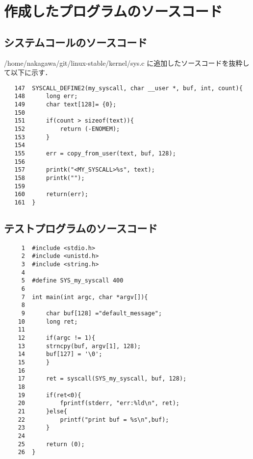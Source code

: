 \documentclass[12pt]{jsarticle}
\begin{document}
\section{作成したプログラムのソースコード}
\subsection{システムコールのソースコード}\label{sec:syscall}
 /home/nakagawa/git/linux-stable/kernel/sys.c に追加したソースコードを抜粋して以下に示す．
\begin{verbatim}
   147	SYSCALL_DEFINE2(my_syscall, char __user *, buf, int, count){
   148		long err;
   149		char text[128]= {0};
   150	
   151		if(count > sizeof(text)){
   152			return (-ENOMEM);
   153		}
   154	
   155		err = copy_from_user(text, buf, 128);
   156	
   157		printk("<MY_SYSCALL>%s", text);
   158		printk("");
   159	
   160		return(err);
   161	}
\end{verbatim}
 \subsection{テストプログラムのソースコード}\label{sec:test}
\begin{verbatim}
     1	#include <stdio.h>
     2	#include <unistd.h>
     3	#include <string.h>
     4	
     5	#define SYS_my_syscall 400
     6	
     7	int main(int argc, char *argv[]){
     8	
     9		char buf[128] ="default_message";
    10		long ret;
    11	
    12		if(argc != 1){
    13		strncpy(buf, argv[1], 128);
    14		buf[127] = '\0';
    15		}
    16	
    17		ret = syscall(SYS_my_syscall, buf, 128);
    18	
    19		if(ret<0){
    20			fprintf(stderr, "err:%ld\n", ret);
    21		}else{
    22			printf("print buf = %s\n",buf);
    23		}
    24	
    25		return (0);
    26	}
\end{verbatim}

%
\end{document}
